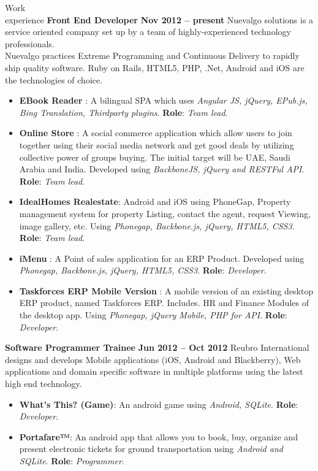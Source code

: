 \documentclass{resume}
\begin{document}
\begin{category}{Work \\experience}
  \citemnobullet \textbf{Front End Developer} \hfill \textbf{Nov 2012 -- present}
  \citemnobullet Nuevalgo solutions is a service oriented company set up by a team of highly-experienced technology professionals. \\Nuevalgo practices Extreme Programming and Continuous
  Delivery to rapidly ship quality software. Ruby on Rails, HTML5, PHP, .Net, Android and iOS are the technologies of choice.
  \begin{itemize}
  \item \textbf{EBook Reader} : A bilingual SPA which uses {\em Angular JS, jQuery, EPub.js, Bing Translation, Thirdparty plugins}. \textbf{Role}: {\em Team lead}. 
  \item \textbf{Online Store} : A social commerce application which allow users to join together using their social media network and get good deals by utilizing collective power of groups buying. The initial target will be UAE, Saudi Arabia and India. Developed using {\em BackboneJS, jQuery and RESTFul API}. \textbf{Role}: {\em Team lead}.
  \item \textbf{IdealHomes Realestate}: Android and iOS using PhoneGap, Property management system for property Listing, contact the agent, request Viewing, image gallery, etc. Using {\em Phonegap, Backbone.js, jQuery, HTML5, CSS3}. \textbf{Role}: {\em Team lead}.
  \item \textbf{iMenu} : A Point of sales application for an ERP Product. Developed using {\em Phonegap, Backbone.js, jQuery, HTML5, CSS3}. \textbf{Role}: {\em Developer}.
  \item \textbf{Taskforces ERP Mobile Version} : A mobile version of an existing desktop ERP product, named Taskforces ERP. Includes. HR and Finance Modules of the desktop app. Using{\em
      Phonegap, jQuery Mobile, PHP for API}. \textbf{Role}: {\em Developer}. 
  \end{itemize}
  \citemnobullet \textbf{Software Programmer Trainee} \hfill \textbf{Jun 2012 -- Oct 2012}
  \citemnobullet Reubro International designs and develops Mobile applications (iOS, Android and Blackberry), Web applications and domain specific software in multiple platforms using the latest high end technology.
  \begin{itemize} 
  \item \textbf{What’s This? (Game)}: An android game using {\em Android, SQLite}. \textbf{Role}: {\em Developer}.
  \item \textbf{Portafare™}:  An android app that allows you to book, buy, organize and present electronic tickets for ground transportation using {\em Android and SQLite}. \textbf{Role}: {\em Programmer}.
  \end{itemize}
\end{category}
\end{document}
